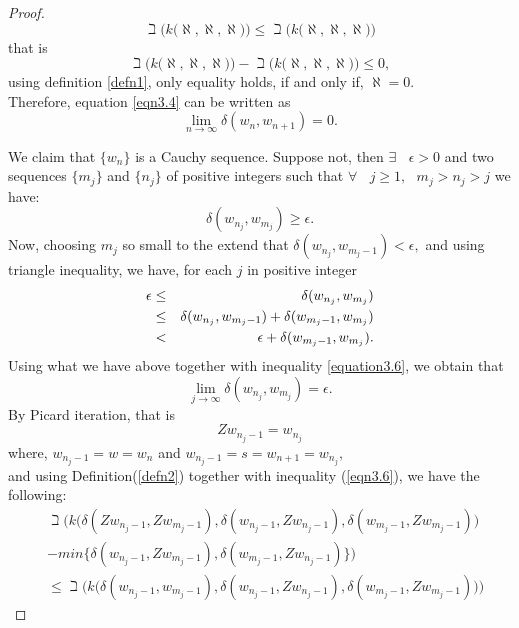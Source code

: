 \documentclass[11pt,reqno]{amsart}
\theoremstyle{definition}
\theoremstyle{remark}
\numberwithin{equation}{section}
\begin{document}
\begin{proof}
		\begin{equation*}
			\beth \Big(k\Big(\aleph, \aleph, \aleph\Big)\Big) 
			\leq \beth \Big( k\Big(\aleph,\aleph,\aleph\Big) \Big) 
		\end{equation*}
		that is $$\beth \Big(k\Big(\aleph, \aleph, \aleph\Big)\Big) 
		- \beth \Big(k\Big(\aleph,\aleph,\aleph\Big)\Big) \leq  0,$$
		using definition \ref{defn1}, only equality holds, if and only if, $\aleph = 0.$ \\
		Therefore, equation \ref{eqn3.4} can be written as 
		\begin{equation}\label{equation3.6}
			\lim_{n \to \infty} \delta(w_{n}, w_{n+1}) = 0.
		\end{equation}
		
		We claim that $\{w_{n}\}$ is a Cauchy sequence. Suppose not, then $\exists~~~~ \epsilon >0$ and two sequences $\{m_{j}\}$ and $\{n_{j}\}$ of positive integers such that $ \forall~~~~ j \geq 1,~~~m_j > n_j > j$ we have:
		\begin{equation*}
		\delta(w_{n_j},w_{m_j})\geq \epsilon.
		\end{equation*}
		Now, choosing $m_j$ so small to the extend that $\delta(w_{n_j},w_{m_j-1})< \epsilon,$ and using triangle inequality, we have, for each $j$ in positive integer
		\begin{eqnarray}
		\epsilon &\leq& \delta(w_{n_j},w_{m_j})\notag\\
		&\leq& \delta(w_{n_j},w_{m_j-1}) + \delta(w_{m_j-1},w_{m_j})\notag\\
		&<& \epsilon + \delta(w_{m_j-1},w_{m_j}).
		\end{eqnarray} 
		Using what we have above together with inequality \ref{equation3.6}, we obtain that
		\begin{equation*}
		\lim_{j \to \infty} \delta(w_{n_j},w_{m_j}) = \epsilon.
		\end{equation*}
		By Picard iteration, that is
		$$Zw_{n_j-1} = w_{n_j}$$
		where, $w_{n_j-1} = w= w_{n}$ and $w_{n_j-1} =s=w_{n+1}= w_{n_j},$\\
		and using Definition(\ref{defn2}) together with inequality (\ref{eqn3.6}), we have the following:
		\begin{eqnarray*}
		&\beth \Big(k\Big(\delta(Zw_{n_j-1},Zw_{m_j-1}),\delta(w_{n_j-1},Zw_{n_j-1}), \delta(w_{m_j-1},Zw_{m_j-1})\Big)\\
		&- min\{ \delta(w_{n_j-1},Zw_{m_j-1}), \delta(w_{m_j-1},Zw_{n_j-1})\}\Big)\\
		&\leq \beth\Big(k\Big(\delta(w_{n_j-1},w_{m_j-1}), \delta(w_{n_j-1},Zw_{n_j-1}), \delta(w_{m_j-1},Zw_{m_j-1})\Big)\Big)

\end{eqnarray*}
\end{proof}
\end{document}
